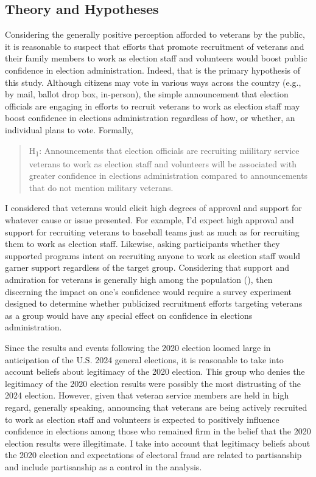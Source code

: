 \documentclass[
  12pt,
  letterpaper,
]{article}
\begin{document}
\subsection{Theory and Hypotheses}\label{theory-and-hypotheses}

Considering the generally positive perception afforded to veterans by
the public, it is reasonable to suspect that efforts that promote
recruitment of veterans and their family members to work as election
staff and volunteers would boost public confidence in election
administration. Indeed, that is the primary hypothesis of this study.
Although citizens may vote in various ways across the country (e.g., by
mail, ballot drop box, in-person), the simple announcement that election
officials are engaging in efforts to recruit veterans to work as
election staff may boost confidence in elections administration
regardless of how, or whether, an individual plans to vote. Formally,

\begin{quote}
H\textsubscript{1}: Announcements that election officials are recruiting
miilitary service veterans to work as election staff and volunteers will
be associated with greater confidence in elections administration
compared to announcements that do not mention military veterans.
\end{quote}

I considered that veterans would elicit high degrees of approval and
support for whatever cause or issue presented. For example, I'd expect
high approval and support for recruiting veterans to baseball teams just
as much as for recruiting them to work as election staff. Likewise,
asking participants whether they supported programs intent on recruiting
anyone to work as election staff would garner support regardless of the
target group. Considering that support and admiration for veterans is
generally high among the population
(), then
discerning the impact on one's confidence would require a survey
experiment designed to determine whether publicized recruitment efforts
targeting veterans as a group would have any special effect on
confidence in elections administration.

Since the results and events following the 2020 election loomed large in
anticipation of the U.S. 2024 general elections, it is reasonable to
take into account beliefs about legitimacy of the 2020 election. This
group who denies the legitimacy of the 2020 election results were
possibly the most distrusting of the 2024 election. However, given that
veteran service members are held in high regard, generally speaking,
announcing that veterans are being actively recruited to work as
election staff and volunteers is expected to positively influence
confidence in elections among those who remained firm in the belief that
the 2020 election results were illegitimate. I take into account that
legitimacy beliefs about the 2020 election and expectations of electoral
fraud are related to partisanship and include partisanship as a control
in the analysis.
\end{document}
